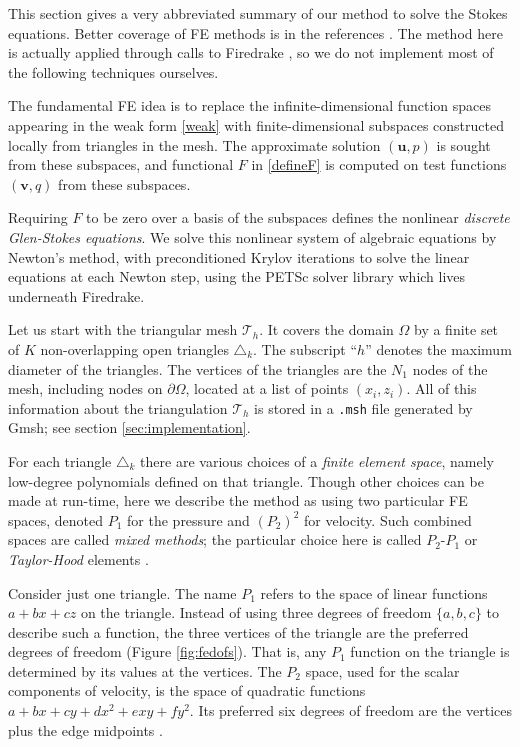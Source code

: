 \documentclass[letterpaper,final,12pt,reqno]{amsart}
\newcommand{\bu}{\mathbf{u}}
\newcommand{\bv}{\mathbf{v}}
\begin{document}
This section gives a very abbreviated summary of our method to solve the Stokes equations.  Better coverage of FE methods is in the references \cite{Braess2007,BuelerBook,Elmanetal2014}.  The method here is actually applied through calls to Firedrake \cite{Rathgeberetal2016}, so we do not implement most of the following techniques ourselves.

The fundamental FE idea is to replace the infinite-dimensional function spaces appearing in the weak form \eqref{weak} with finite-dimensional subspaces constructed locally from triangles in the mesh.  The approximate solution $(\bu,p)$ is sought from these subspaces, and functional $F$ in \eqref{defineF} is computed on test functions $(\bv,q)$ from these subspaces.

Requiring $F$ to be zero over a basis of the subspaces defines the nonlinear \emph{discrete Glen-Stokes equations}.  We solve this nonlinear system of algebraic equations by Newton's method, with preconditioned Krylov iterations to solve the linear equations at each Newton step, using the PETSc solver library \cite{Balayetal2018,BuelerBook} which lives underneath Firedrake.

Let us start with the triangular mesh $\mathcal{T}_h$.  It covers the domain $\Omega$ by a finite set of $K$ non-overlapping open triangles $\triangle_k$.  The subscript ``$h$'' denotes the maximum diameter of the triangles.  The vertices of the triangles are the $N_1$ nodes of the mesh, including nodes on $\partial\Omega$, located at a list of points $(x_i,z_i)$.  All of this information about the triangulation $\mathcal{T}_h$ is stored in a \texttt{.msh} file generated by Gmsh; see section \ref{sec:implementation}.

For each triangle $\triangle_k$ there are various choices of a \emph{finite element space}, namely low-degree polynomials defined on that triangle.  Though other choices can be made at run-time, here we describe the method as using two particular FE spaces, denoted $P_1$ for the pressure and $(P_2)^2$ for velocity.  Such combined spaces are called \emph{mixed methods}; the particular choice here is called $P_2$-$P_1$ or \emph{Taylor-Hood} elements \cite{Elmanetal2014}.

Consider just one triangle.  The name $P_1$ refers to the space of linear functions $a + b x + c z$ on the triangle.  Instead of using three degrees of freedom $\{a,b,c\}$ to describe such a function, the three vertices of the triangle are the preferred degrees of freedom (Figure \ref{fig:fedofs}).  That is, any $P_1$ function on the triangle is determined by its values at the vertices.  The $P_2$ space, used for the scalar components of velocity, is the space of quadratic functions $a + bx + cy + dx^2 + exy + fy^2$.  Its preferred six degrees of freedom are the vertices plus the edge midpoints \cite{Elmanetal2014}.
\end{document}
